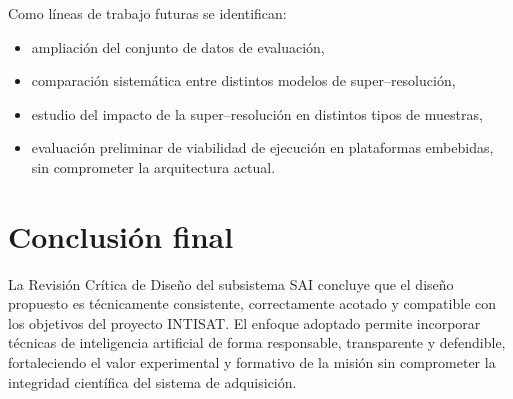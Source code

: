 Como líneas de trabajo futuras se identifican:

\begin{itemize}
    \item ampliación del conjunto de datos de evaluación,
    \item comparación sistemática entre distintos modelos de super--resolución,
    \item estudio del impacto de la super--resolución en distintos tipos de
    muestras,
    \item evaluación preliminar de viabilidad de ejecución en plataformas
    embebidas, sin comprometer la arquitectura actual.
\end{itemize}

\section{Conclusión final}

La Revisión Crítica de Diseño del subsistema SAI concluye que el diseño propuesto
es técnicamente consistente, correctamente acotado y compatible con los
objetivos del proyecto INTISAT. El enfoque adoptado permite incorporar técnicas
de inteligencia artificial de forma responsable, transparente y defendible,
fortaleciendo el valor experimental y formativo de la misión sin comprometer la
integridad científica del sistema de adquisición.
